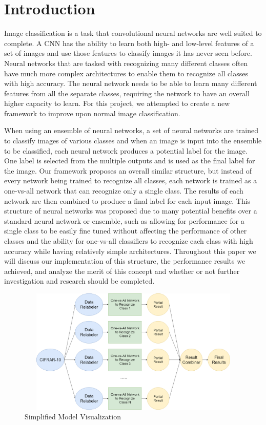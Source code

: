 \documentclass[10pt,twocolumn,letterpaper]{article}
\begin{document}
\section{Introduction}
Image classification is a task that convolutional neural networks are well suited to complete. A CNN has the ability to learn both high- and low-level features of a set of images and use those features to classify images it has never seen before. Neural networks that are tasked with recognizing many different classes often have much more complex architectures to enable them to recognize all classes with high accuracy. The neural network needs to be able to learn many different features from all the separate classes, requiring the network to have an overall higher capacity to learn. For this project, we attempted to create a new framework to improve upon normal image classification.

When using an ensemble of neural networks, a set of neural networks are trained to classify images of various classes and when an image is input into the ensemble to be classified, each neural network produces a potential label for the image. One label is selected from the multiple outputs and is used as the final label for the image. Our framework proposes an overall similar structure, but instead of every network being trained to recognize all classes, each network is trained as a one-vs-all network that can recognize only a single class. The results of each network are then combined to produce a final label for each input image. This structure of neural networks was proposed due to many potential benefits over a standard neural network or ensemble, such as allowing for performance for a single class to be easily fine tuned without affecting the performance of other classes and the ability for one-vs-all classifiers to recognize each class with high accuracy while having relatively simple architectures. Throughout this paper we will discuss our implementation of this structure, the performance results we achieved, and analyze the merit of this concept and whether or not further investigation and research should be completed.

\begin{figure}
	\begin{center}
	\includegraphics[width=12cm,height=6cm]{architecture_revised.png}
	\end{center}
	\caption{Simplified Model Visualization}
\end{figure}
\end{document}
